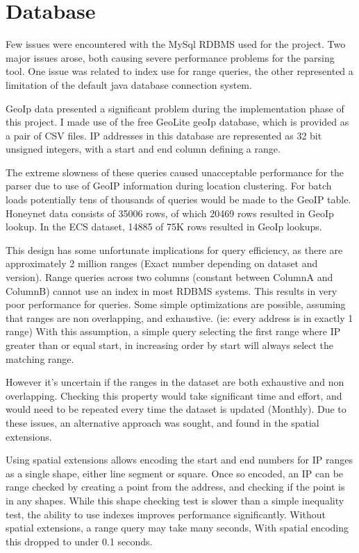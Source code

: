 \section{Database}\label{imp_db}
Few issues were encountered with the MySql RDBMS used for the project. Two major issues arose, both causing severe performance problems for the parsing tool. One issue was related to index use for range queries, the other represented a limitation of the default java database connection system. 

GeoIp data presented a significant problem during the implementation phase of this project. I made use of the free GeoLite geoIp database, which is provided as a pair of CSV files. IP addresses in this database are represented as 32 bit unsigned integers, with a start and end column defining a range.

The extreme slowness of these queries caused unacceptable performance for the parser due to use of GeoIP information during location clustering. For batch loads potentially tens of thousands of queries would be made to the GeoIP table. Honeynet data consists of 35006 rows, of which 20469 rows resulted in GeoIp lookup. In the ECS dataset, 14885 of 75K rows resulted in GeoIp lookups. 

This design has some unfortunate implications for query efficiency, as there are approximately 2 million ranges (Exact number depending on dataset and version). Range queries across two columns (constant between ColumnA and ColumnB) cannot use an index in most RDBMS systems. This results in very poor performance for queries.
Some simple optimizations are possible, assuming that ranges are non overlapping, and exhaustive. (ie: every address is in exactly 1 range)  With this assumption, a simple query selecting the first range where IP greater than or equal start, in increasing order by start will always select the matching range.

However it's uncertain if the ranges in the dataset are both exhaustive and non overlapping. Checking this property would take significant time and effort, and would need to be repeated  every time the dataset is updated (Monthly). Due to these issues, an alternative approach was sought, and found in the spatial extensions.

Using spatial extensions allows encoding the start and end numbers for IP ranges as a single shape, either line segment or square. Once so encoded, an IP can be range checked by creating a point from the address, and checking if the point is in any shapes. While this shape checking test is slower than a simple inequality test, the ability to use indexes improves performance significantly. Without spatial extensions, a range query may take many seconds, With spatial encoding this dropped to under 0.1 seconds.  

